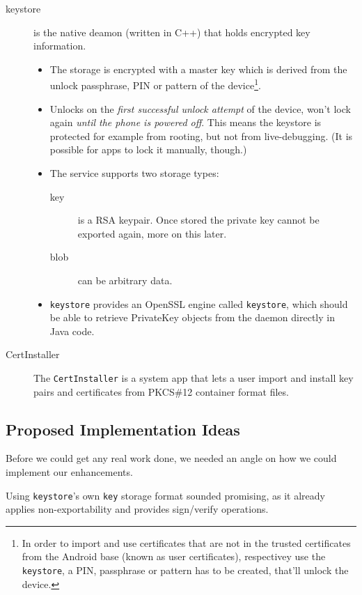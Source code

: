 \documentclass[a4paper]{scrartcl}
\begin{document}
\begin{description}
			\item[keystore] is the native deamon (written in C++) that holds encrypted key information.
				\begin{itemize}
					\item The storage is encrypted with a master key which is derived from the unlock passphrase, PIN or pattern of the device\footnote{In order to import and use certificates that are not in the trusted certificates from the Android base (known as user certificates), respectivey use the \texttt{keystore}, a PIN, passphrase or pattern has to be created, that'll unlock the device.}.
					\item Unlocks on the \emph{first successful unlock attempt} of the device, won't lock again \emph{until the phone is powered off}. This means the keystore is protected for example from rooting, but not from live-debugging. (It is possible for apps to lock it manually, though.)
					\item The service supports two storage types:
					\begin{description}
						\item[key] is a RSA keypair. Once stored the private key cannot be exported again, more on this later.
						\item[blob] can be arbitrary data.
					\end{description}
					\item \texttt{keystore} provides an OpenSSL engine called \texttt{keystore}, which should be able to retrieve PrivateKey objects from the daemon directly in Java code.
				\end{itemize}
			\item [CertInstaller] The \texttt{CertInstaller} is a system app that lets a user import and install key pairs and certificates from PKCS\#12 container format files. %
		\end{description}



	\subsection{Proposed Implementation Ideas}
		Before we could get any real work done, we needed an angle on how we could implement our enhancements.

		Using \texttt{keystore}'s own \texttt{key} storage format sounded promising, as it already applies non-exportability and provides sign/verify operations.
\end{document}
